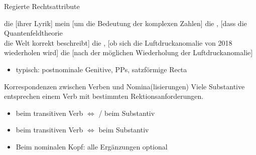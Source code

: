 \begin{frame}
  {Regierte Rechtsattribute}
  \pause
  \begin{exe}
    \ex die  \alert{[ihrer Lyrik]}
    \pause
    \ex mein  \alert{[um die Bedeutung der komplexen Zahlen]}
    \pause
    \ex die , \alert{[dass die Quantenfeldtheorie \\
    die Welt korrekt beschreibt]}
    \pause
    \ex die , \alert{[ob sich die Luftdruckanomalie von 2018 wiederholen wird]}
    \pause
    \ex die  \alert{[nach der möglichen Wiederholung der Luftdruckanomalie]}
  \end{exe}
  \pause
  \Halbzeile
  \begin{itemize}[<+->]
    \item typisch: postnominale Genitive, PPs, satzförmige Recta
  \end{itemize}
\end{frame}


\begin{frame}
  {Korrespondenzen zwischen Verben und Nomina(lisierungen)}
  \pause
  Viele Substantive entsprechen einem Verb mit bestimmten Rektionsanforderungen.\\
  \pause
  \Zeile
  \begin{exe}
    \ex\label{ex:rektionundvalenzindernp031}
    \begin{xlist}
      \pause
      \pause
    \end{xlist}
  \end{exe}
  \pause
  \Zeile
  \begin{itemize}[<+->]
    \item {} beim transitiven Verb $\Leftrightarrow$ \slash{} beim Substantiv
    \item {} beim transitiven Verb $\Leftrightarrow$  beim Substantiv
    \item Beim nominalen Kopf: alle Ergänzungen optional
  \end{itemize}
\end{frame}


